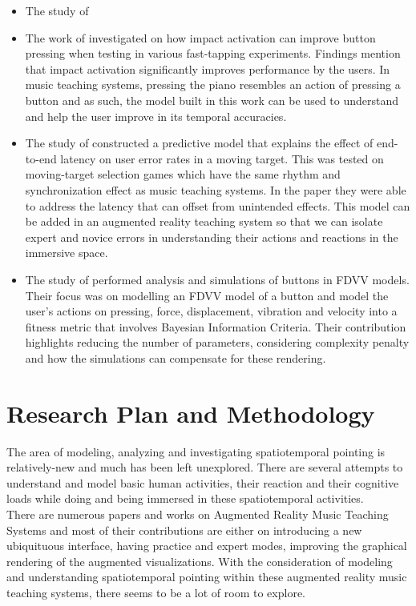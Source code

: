 \documentclass{article}
\begin{document}
\begin{itemize}
\item The study of \cite{lee2018moving}
\item The work of \cite{kim2018impact} investigated on how impact activation can improve button pressing when testing in various fast-tapping experiments. Findings mention that impact activation significantly improves performance by the users. In music teaching systems, pressing the piano resembles an action of pressing a button and as such, the model built in this work can be used to understand and help the user improve in its temporal accuracies. 
\item The study of \cite{lee2019geometrically} constructed a predictive model that explains the effect of end-to-end latency on user error rates in a moving target. This was tested on moving-target selection games which have the same rhythm and synchronization effect as music teaching systems. In the paper they were able to address the latency that can offset from unintended effects. This model can be added in an augmented reality teaching system so that we can isolate expert and novice errors in understanding their actions and reactions in the immersive space. 
\item The study of \cite{liao2020button} performed analysis and simulations of buttons in FDVV models. Their focus was on modelling an FDVV model of a button and model the user's actions on pressing, force, displacement, vibration and velocity into a fitness metric that involves Bayesian Information Criteria. Their contribution highlights reducing the number of parameters, considering complexity penalty and how the simulations can compensate for these rendering. 
\end{itemize}
\section{Research Plan and Methodology}
The area of modeling, analyzing and investigating spatiotemporal pointing is relatively-new and much has been left unexplored. There are several attempts to understand and model basic human activities, their reaction and their cognitive loads while doing and being immersed in these spatiotemporal activities.\\

There are numerous papers and works on Augmented Reality Music Teaching Systems and most of their contributions are either on introducing a new ubiquituous interface, having practice and expert modes, improving the graphical rendering of the augmented visualizations. With the consideration of modeling and understanding spatiotemporal pointing within these augmented reality music teaching systems, there seems to be a lot of room to explore.\\
\end{document}
